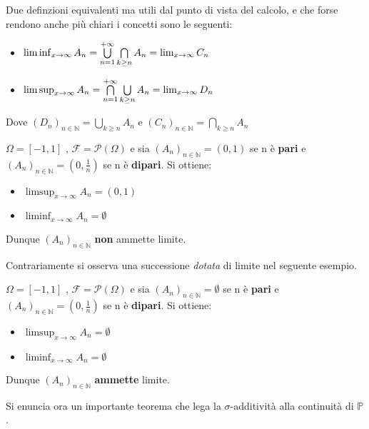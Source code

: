 Due definzioni equivalenti ma utili dal punto di vista del calcolo, e che forse rendono anche più chiari i concetti sono le seguenti:
\begin{itemize}
    \item $\liminf_{x\to\infty} A_n= \large\bigcup\limits_{n=1}^{+\infty} \bigcap\limits_{k\geq n} A_n=\lim_{x\to\infty} C_n$
    \item $\limsup_{x\to\infty} A_n= \large\bigcap\limits_{n=1}^{+\infty} \bigcup\limits_{k\geq n} A_n=\lim_{x\to\infty} D_n$
\end{itemize}

Dove $(D_n)_{n\in\mathbb{N}}=\bigcup\limits_{k\geq n} A_n$ e $(C_n)_{n\in\mathbb{N}}=\bigcap\limits_{k\geq n} A_n$

\begin{example}
    $\Omega=[-1,1]$ , $\mathscr{F}=\mathscr{P}(\Omega)$ e sia $(A_n)_{n\in\mathbb{N}} = (0,1)$ se n è  \textbf{pari} e $(A_n)_{n\in\mathbb{N}} = (0,\frac{1}{n})$ se n è  \textbf{dipari}. Si ottiene:
    \begin{itemize}
        \item $\limsup_{x\to\infty} A_n= (0,1)$
        \item $\liminf_{x\to\infty} A_n= \emptyset$
    \end{itemize}
    Dunque $(A_n)_{n\in\mathbb{N}}$ \textbf{non} ammette limite.
\end{example}
\newpage
Contrariamente si osserva una successione \textit{dotata} di limite nel seguente esempio.
\begin{example}
     $\Omega=[-1,1]$ , $\mathscr{F}=\mathscr{P}(\Omega)$ e sia $(A_n)_{n\in\mathbb{N}} = \emptyset$ se n è  \textbf{pari} e $(A_n)_{n\in\mathbb{N}} = (0,\frac{1}{n})$ se n è  \textbf{dipari}. Si ottiene:
    \begin{itemize}
        \item $\limsup_{x\to\infty} A_n= \emptyset$
        \item $\liminf_{x\to\infty} A_n= \emptyset$
    \end{itemize}
    Dunque $(A_n)_{n\in\mathbb{N}}$ \textbf{ammette} limite.
\end{example}

Si enuncia ora un importante teorema che lega la $\sigma$-additività alla continuità di $\mathbb{P}$.

